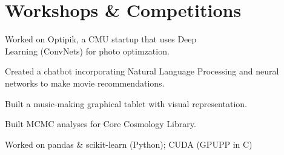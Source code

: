 \documentclass[]{deedy-resume-openfont}
\begin{document}
\section{\color{Blue} Workshops \& Competitions}
\begin{minipage}{0.5\textwidth} 



Worked on Optipik, a CMU startup that uses Deep\\ Learning (ConvNets) for photo optimzation.
\sectionsep


Created a chatbot incorporating Natural Language Processing and neural networks to make movie recommendations.
\sectionsep



\end{minipage}%
\begin{minipage}{0.5\textwidth}

Built a music-making graphical tablet with visual representation.

\sectionsep
{}
Built MCMC analyses for Core Cosmology Library.

\sectionsep
{}
Worked on pandas \& scikit-learn (Python); CUDA (GPUPP in C)
\sectionsep

\end{minipage}



\end{document}
